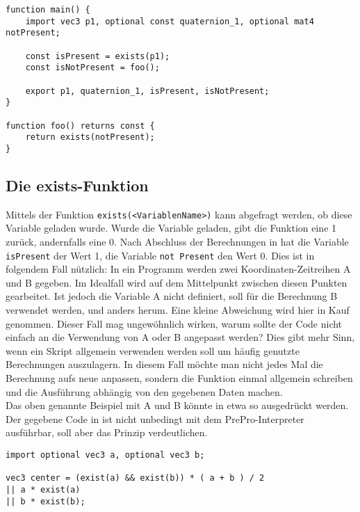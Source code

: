 \begin{lstlisting}[language=prepro, label={lst:OptionalImport}, caption={PrePro-Code mit optionalen Imports}, captionpos=b]
function main() {
	import vec3 p1, optional const quaternion_1, optional mat4 notPresent;

	const isPresent = exists(p1);
	const isNotPresent = foo();

	export p1, quaternion_1, isPresent, isNotPresent;
}

function foo() returns const {
	return exists(notPresent);
}
\end{lstlisting}

\subsection{Die exists-Funktion}
Mittels der Funktion \texttt{exists(<VariablenName>)} kann abgefragt werden, ob diese Variable geladen wurde.
Wurde die Variable geladen, gibt die Funktion eine 1 zurück, andernfalls eine 0.
Nach Abschluss der Berechnungen in  hat die Variable \texttt{isPresent} der Wert 1, die Variable \texttt{not Present} den Wert 0.
Dies ist in folgendem Fall nützlich:
In ein Programm werden zwei Koordinaten-Zeitreihen A und B gegeben.
Im Idealfall wird auf dem Mittelpunkt zwischen diesen Punkten gearbeitet.
Ist jedoch die Variable A nicht definiert, soll für die Berechnung B verwendet werden, und anders herum.
Eine kleine Abweichung wird hier in Kauf genommen.
Dieser Fall mag ungewöhnlich wirken, warum sollte der Code nicht einfach an die Verwendung von A oder B angepasst werden?
Dies gibt mehr Sinn, wenn ein Skript allgemein verwenden werden soll um häufig genutzte Berechnungen auszulagern.
In diesem Fall möchte man nicht jedes Mal die Berechnung aufs neue anpassen, sondern die Funktion einmal allgemein schreiben und die Ausführung abhängig von den gegebenen Daten machen.\\
Das oben genannte Beispiel mit A und B könnte in etwa so ausgedrückt werden.
Der gegebene Code in  ist nicht unbedingt mit dem PrePro-Interpreter ausführbar, soll aber das Prinzip verdeutlichen.
\begin{lstlisting}[language=prepro, label={lst:OptionalImportExample}, caption={PrePro-Code mit optionalen Imports}, captionpos=b]
import optional vec3 a, optional vec3 b;

vec3 center = (exist(a) && exist(b)) * ( a + b ) / 2
|| a * exist(a)
|| b * exist(b);
\end{lstlisting}
